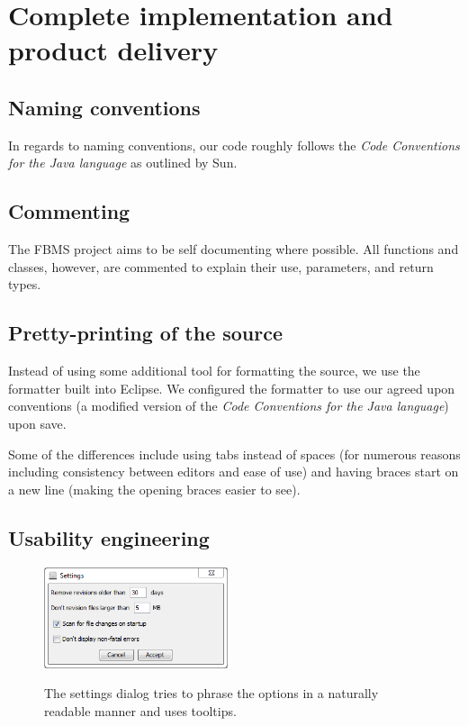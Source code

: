 \documentclass[12pt,a4paper]{article}
\begin{document}
\section{Complete implementation and product delivery}

\subsection{Naming conventions}
In regards to naming conventions, our code roughly follows the \textit{Code Conventions for the Java language}\cite{conventions} as outlined by Sun.

\subsection{Commenting}
The FBMS project aims to be self documenting where possible. All functions and classes, however, are commented to explain their use, parameters, and return types.

\subsection{Pretty-printing of the source}
Instead of using some additional tool for formatting the source, we use the formatter built into Eclipse\cite{eclipse}. We configured the formatter to use our agreed upon conventions (a modified version of the \textit{Code Conventions for the Java language}\cite{conventions}) upon save.

Some of the differences include using tabs instead of spaces (for numerous reasons including consistency between editors and ease of use) and having braces start on a new line (making the opening braces easier to see).

\subsection{Usability engineering}
\begin{figure}
\vspace{-20pt}
\begin{center}
\includegraphics[width=0.48\textwidth]{images/settings.png}
\end{center}
\footnotesize{The settings dialog tries to phrase the options in a naturally readable manner and uses tooltips.}
\end{figure}
\end{document}
